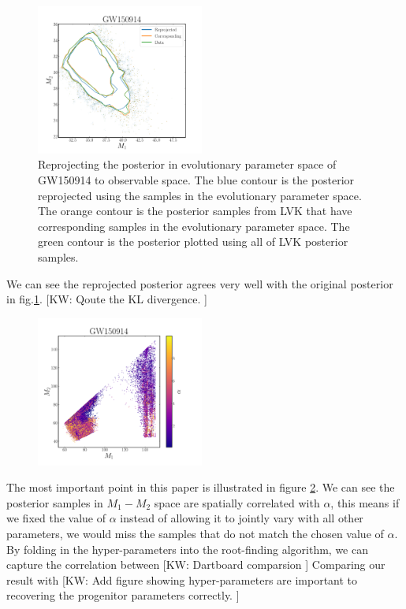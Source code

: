 \documentclass[twocolumn]{aastex631}
\newcommand{\kw}[1]{{\color{rb4}[KW: #1 ]}}
\begin{document}
\begin{figure}
\includegraphics[width=0.49\textwidth]{static/GW150914_reprojection.pdf}
\caption{Reprojecting the posterior in evolutionary parameter space of GW150914 to observable space.
The blue contour is the posterior reprojected using the samples in the evolutionary parameter space.
The orange contour is the posterior samples from LVK that have corresponding samples in the evolutionary parameter space.
The green contour is the posterior plotted using all of LVK posterior samples.
}
\label{fig:GW150914_reprojection}
\end{figure}

We can see the reprojected posterior agrees very well with the original posterior in fig.\ref{fig:GW150914_reprojection}.
\kw{Qoute the KL divergence.}



\begin{figure}
\includegraphics[width=0.49\textwidth]{static/GW150914_m1m2alpha.png}
\caption{}
\label{fig:GW150914_m1_m2_alpha}
\end{figure}


The most important point in this paper is illustrated in figure \ref{fig:GW150914_m1_m2_alpha}.
We can see the posterior samples in $M_1-M_2$ space are spatially correlated with $\alpha$,
this means if we fixed the value of $\alpha$ instead of allowing it to jointly vary with all other parameters,
we would miss the samples that do not match the chosen value of $\alpha$.
By folding in the hyper-parameters into the root-finding algorithm,
we can capture the correlation between 
\kw{Dartboard comparsion} Comparing our result with 
\kw{Add figure showing hyper-parameters are important to recovering the progenitor parameters correctly.}
\end{document}
